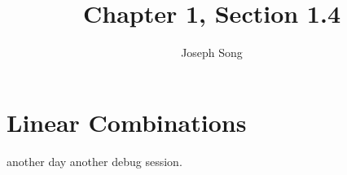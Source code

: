 \documentclass{article}
\title{Chapter 1, Section 1.4}
\author{Joseph Song}
\date{}
\begin{document}
 
\maketitle

\section{Linear Combinations}
another day another debug session.
 
\end{document}
